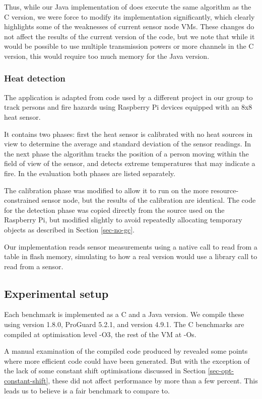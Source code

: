 Thus, while our Java implementation of  does execute the same algorithm as the C version, we were force to modify its implementation significantly, which clearly highlights some of the weaknesses of current sensor node VMs. These changes do not affect the results of the current version of the code, but we note that while it would be possible to use multiple transmission powers or more channels in the C version, this would require too much memory for the Java version.

\subsubsection{Heat detection}
The  application is adapted from code used by a different project in our group to track persons and fire hazards using Raspberry Pi devices equipped with an 8x8 heat sensor.

It contains two phases: first the heat sensor is calibrated with no heat sources in view to determine the average and standard deviation of the sensor readings. In the next phase the algorithm tracks the position of a person moving within the field of view of the sensor, and detects extreme temperatures that may indicate a fire. In the evaluation both phases are listed separately.

The calibration phase was modified to allow it to run on the more resource-constrained sensor node, but the results of the calibration are identical. The code for the detection phase was copied directly from the source used on the Raspberry Pi, but modified slightly to avoid repeatedly allocating temporary objects as described in Section \ref{sec-no-gc}.

Our implementation reads sensor measurements using a native call to read from a table in flash memory, simulating to how a real version would use a library call to read from a sensor.


\subsection{Experimental setup}
Each benchmark is implemented as a C and a Java version. We compile these using  version 1.8.0, ProGuard 5.2.1, and  version 4.9.1. The C benchmarks are compiled at optimisation level -O3, the rest of the VM at -Os.

A manual examination of the compiled code produced by  revealed some points where more efficient code could have been generated. But with the exception of the lack of some constant shift optimisations discussed in Section \ref{sec-opt-constant-shift}, these did not affect performance by more than a few percent. This leads us to believe  is a fair benchmark to compare to.

